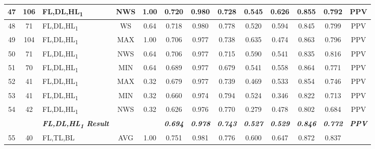 \begin{table}[H]
{\begin{tabular}{cc|l|cc|c|c|c|c|c|c|c|c|}
  \multicolumn{1}{|c|}{47} &
    106 &
    FL,DL,HL\textsubscript{1} &
    \multicolumn{1}{c|}{NWS} &
    1.00 &
    0.720 &
    0.980 &
    0.728 &
    0.545 &
    0.626 &
    0.855 &
    0.792 &
    PPV \\ \hline
  \multicolumn{1}{|c|}{48} &
    71 &
    FL,DL,HL\textsubscript{1} &
    \multicolumn{1}{c|}{WS} &
    0.64 &
    0.718 &
    0.980 &
    0.778 &
    0.520 &
    0.594 &
    0.845 &
    0.799 &
    PPV \\ \hline
  \multicolumn{1}{|c|}{49} &
    104 &
    FL,DL,HL\textsubscript{1} &
    \multicolumn{1}{c|}{MAX} &
    1.00 &
    0.706 &
    0.977 &
    0.738 &
    0.635 &
    0.474 &
    0.863 &
    0.796 &
    PPV \\ \hline
  \multicolumn{1}{|c|}{50} &
    71 &
    FL,DL,HL\textsubscript{1} &
    \multicolumn{1}{c|}{NWS} &
    0.64 &
    0.706 &
    0.977 &
    0.715 &
    0.590 &
    0.541 &
    0.835 &
    0.816 &
    PPV \\ \hline
  \multicolumn{1}{|c|}{51} &
    70 &
    FL,DL,HL\textsubscript{1} &
    \multicolumn{1}{c|}{MIN} &
    0.64 &
    0.689 &
    0.977 &
    0.679 &
    0.541 &
    0.558 &
    0.864 &
    0.771 &
    PPV \\ \hline
  \multicolumn{1}{|c|}{52} &
    41 &
    FL,DL,HL\textsubscript{1} &
    \multicolumn{1}{c|}{MAX} &
    0.32 &
    0.679 &
    0.977 &
    0.739 &
    0.469 &
    0.533 &
    0.854 &
    0.746 &
    PPV \\ \hline
  \multicolumn{1}{|c|}{53} &
    41 &
    FL,DL,HL\textsubscript{1} &
    \multicolumn{1}{c|}{MIN} &
    0.32 &
    0.660 &
    0.974 &
    0.794 &
    0.524 &
    0.346 &
    0.822 &
    0.713 &
    PPV \\ \hline
  \multicolumn{1}{|c|}{54} &
    42 &
    FL,DL,HL\textsubscript{1} &
    \multicolumn{1}{c|}{NWS} &
    0.32 &
    0.626 &
    0.976 &
    0.770 &
    0.279 &
    0.478 &
    0.802 &
    0.684 &
    PPV \\ \hline
   &
    \textit{\textbf{}} &
    \textit{\textbf{FL,DL,HL\textsubscript{1} Result}} &
     &
     &
    \textit{\textbf{0.694}} &
    \textit{\textbf{0.978}} &
    \textit{\textbf{0.743}} &
    \textit{\textbf{0.527}} &
    \textit{\textbf{0.529}} &
    \textit{\textbf{0.846}} &
    \textit{\textbf{0.772}} &
    \textit{\textbf{PPV}} \\ \hline 
  \multicolumn{1}{|c|}{55} &
    40 &
    FL,TL,BL &
    \multicolumn{1}{c|}{AVG} &
    1.00 &
    0.751 &
    0.981 &
    0.776 &
    0.600 &
    0.647 &
    0.872 &
    0.837 &

\end{tabular}}
\end{table}
